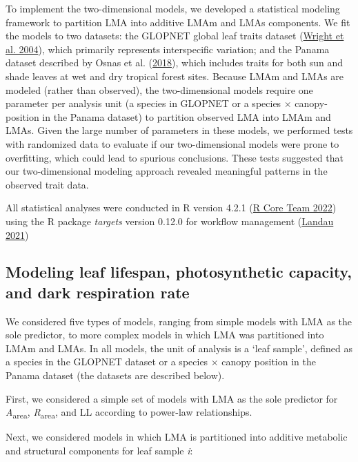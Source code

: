 \documentclass[
  12pt,
  letterpaper,
  DIV=11,
  numbers=noendperiod]{scrartcl}
\begin{document}
To implement the two-dimensional models, we developed a statistical
modeling framework to partition LMA into additive LMAm and LMAs
components. We fit the models to two datasets: the GLOPNET global leaf
traits dataset (\protect\hyperlink{ref-Wright2004a}{Wright et al.
2004}), which primarily represents interspecific variation; and the
Panama dataset described by Osnas et al.
(\protect\hyperlink{ref-Osnas2018}{2018}), which includes traits for
both sun and shade leaves at wet and dry tropical forest sites. Because
LMAm and LMAs are modeled (rather than observed), the two-dimensional
models require one parameter per analysis unit (a species in GLOPNET or
a species \(\times\) canopy-position in the Panama dataset) to partition
observed LMA into LMAm and LMAs. Given the large number of parameters in
these models, we performed tests with randomized data to evaluate if our
two-dimensional models were prone to overfitting, which could lead to
spurious conclusions. These tests suggested that our two-dimensional
modeling approach revealed meaningful patterns in the observed trait
data.

All statistical analyses were conducted in R version 4.2.1
(\protect\hyperlink{ref-RCoreTeam2022}{R Core Team 2022}) using the R
package \emph{targets} version 0.12.0 for workflow management
(\protect\hyperlink{ref-Landau2021}{Landau 2021})

\hypertarget{modeling-leaf-lifespan-photosynthetic-capacity-and-dark-respiration-rate}{%
\subsection{Modeling leaf lifespan, photosynthetic capacity, and dark
respiration
rate}\label{modeling-leaf-lifespan-photosynthetic-capacity-and-dark-respiration-rate}}

We considered five types of models, ranging from simple models with LMA
as the sole predictor, to more complex models in which LMA was
partitioned into LMAm and LMAs. In all models, the unit of analysis is a
`leaf sample', defined as a species in the GLOPNET dataset or a species
\(\times\) canopy position in the Panama dataset (the datasets are
described below).

First, we considered a simple set of models with LMA as the sole
predictor for \emph{A}\textsubscript{area},
\emph{R}\textsubscript{area}, and LL according to power-law
relationships.

Next, we considered models in which LMA is partitioned into additive
metabolic and structural components for leaf sample \emph{i}:
\end{document}
